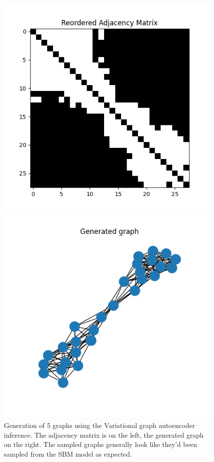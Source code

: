 \documentclass[a4paper]{article}
\begin{document}
\begin{figure}[H]
    \begin{minipage}{.45\textwidth}
      \includegraphics[width=0.6\linewidth]{figures/graph_04_adjacency_matrix.png}
    \end{minipage}\hfill
    \begin{minipage}{.45\textwidth}
      \includegraphics[width=0.6\linewidth]{figures/graph_04_generated_graph.png}
    \end{minipage}
\caption{Generation of 5 graphs using the Variational graph autoencoder inference.
The adjacency matrix is on the left, the generated graph on the right. The sampled graphs generally look like they'd been sampled from the SBM model as expected.}
\label{fig:VAE_graph_generation}
\end{figure}
\end{document}
